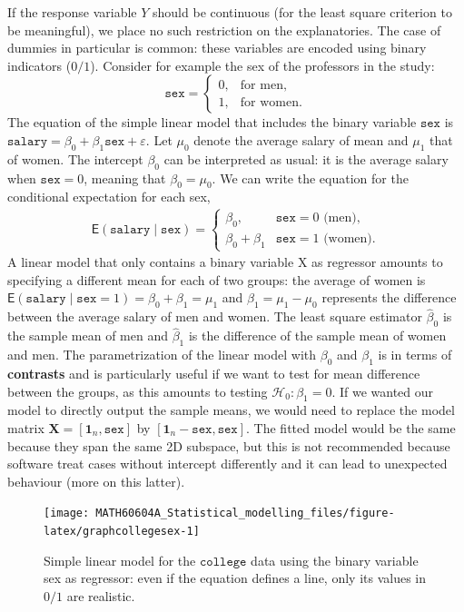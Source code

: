 \documentclass[
  11pt,
  letterpaper,
]{book}
\theoremstyle{definition}
\theoremstyle{definition}
\theoremstyle{definition}
\theoremstyle{definition}
\theoremstyle{remark}
\begin{document}
If the response variable \(Y\) should be continuous (for the least square criterion to be meaningful), we place no such restriction on the explanatories. The case of dummies in particular is common: these variables are encoded using binary indicators (\(0/1\)). Consider for example the sex of the professors in the study:
\[\texttt{sex} = \begin{cases} 0 , & \text{for men},\\
1, & \text{for women.}
\end{cases}
\]
The equation of the simple linear model that includes the binary variable \(\texttt{sex}\) is \(\texttt{salary} = \beta_0 + \beta_1 \texttt{sex} + \varepsilon\). Let \(\mu_0\) denote the average salary of mean and \(\mu_1\) that of women. The intercept \(\beta_0\) can be interpreted as usual: it is the average salary when \(\texttt{sex}=0\), meaning that \(\beta_0=\mu_0\). We can write the equation for the conditional expectation for each sex,
\begin{align*}
\mathsf{E}(\texttt{salary} \mid \texttt{sex})= \begin{cases}
\beta_0, & \texttt{sex}=0 \text{ (men)}, \\
\beta_0 + \beta_1 & \texttt{sex}=1 \text{ (women)}.
\end{cases}
\end{align*}
A linear model that only contains a binary variable \(\mathrm{X}\) as regressor amounts to specifying a different mean for each of two groups: the average of women is \(\mathsf{E}(\texttt{salary} \mid \texttt{sex}=1) = \beta_0 + \beta_1 = \mu_1\) and \(\beta_1=\mu_1-\mu_0\) represents the difference between the average salary of men and women. The least square estimator \(\widehat{\beta}_0\) is the sample mean of men and \(\widehat{\beta}_1\) is the difference of the sample mean of women and men. The parametrization of the linear model with \(\beta_0\) and \(\beta_1\) is in terms of \textbf{contrasts} and is particularly useful if we want to test for mean difference between the groups, as this amounts to testing \(\mathscr{H}_0: \beta_1=0\). If we wanted our model to directly output the sample means, we would need to replace the model matrix \(\mathbf{X}=[\mathbf{1}_n, \texttt{sex}]\) by \([\mathbf{1}_n- \texttt{sex}, \texttt{sex}]\). The fitted model would be the same because they span the same 2D subspace, but this is not recommended because software treat cases without intercept differently and it can lead to unexpected behaviour (more on this latter).

\begin{figure}

{\centering \texttt{[image: MATH60604A\_Statistical\_modelling\_files/figure-latex/graphcollegesex-1]} 

}

\caption{Simple linear model for the $\texttt{college}$ data using the binary variable sex as regressor: even if the equation defines a line, only its values in $0/1$ are realistic.}\label{fig:graphcollegesex}
\end{figure}
\end{document}
